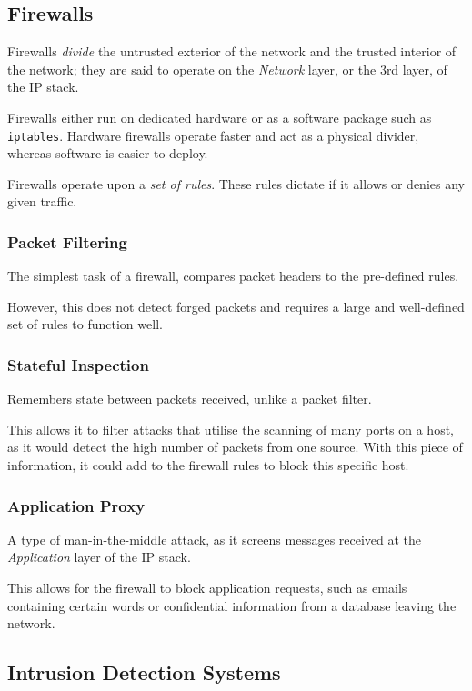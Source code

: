 \documentclass{article}
\begin{document}
\subsection{Firewalls}

Firewalls \textit{divide} the untrusted exterior of the network and the trusted interior of the network; they are said to operate on the \textit{Network} layer, or the 3rd layer, of the IP stack.

Firewalls either run on dedicated hardware or as a software package such as \texttt{iptables}. Hardware firewalls operate faster and act as a physical divider, whereas software is easier to deploy.

Firewalls operate upon a \textit{set of rules}. These rules dictate if it allows or denies any given traffic.

\subsubsection{Packet Filtering}

The simplest task of a firewall, compares packet headers to the pre-defined rules.

However, this does not detect forged packets and requires a large and well-defined set of rules to function well.

\subsubsection{Stateful Inspection}

Remembers state between packets received, unlike a packet filter.

This allows it to filter attacks that utilise the scanning of many ports on a host, as it would detect the high number of packets from one source. With this piece of information, it could add to the firewall rules to block this specific host.

\subsubsection{Application Proxy}

A type of man-in-the-middle attack, as it screens messages received at the \textit{Application} layer of the IP stack.

This allows for the firewall to block application requests, such as emails containing certain words or confidential information from a database leaving the network.

\subsection{Intrusion Detection Systems}
\end{document}
